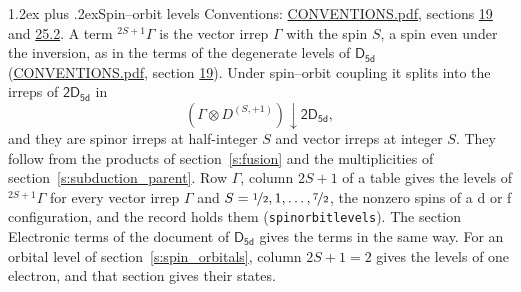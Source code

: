 \documentclass[10pt,a4paper]{article}
\makeatletter
\renewcommand\section{\@startsection{section}{1}{\z@}{-3ex plus -1ex minus -.2ex}%
  {1.2ex plus .2ex}{\normalfont\large\sffamily\bfseries\color{parttitle}}}
\numberwithin{equation}{section}
\newcommand{\grp}[1]{\mathsf{#1}}
\newcommand{\restr}[2]{#1\!\downarrow#2}
\newcommand{\irrJp}[2]{D^{(#1,#2)}}
\newcommand{\irrprod}{\otimes}
\newcommand{\term}[2]{{}^{#1}#2}
\makeatother
\begin{document}
\section{Spin--orbit levels}\label{s:spin_orbit}
Conventions: \href{../../CONVENTIONS.pdf}{CONVENTIONS.pdf}, sections \href{../../../rotation/CONVENTIONS.pdf\#conv.19}{19} and \href{../../CONVENTIONS.pdf\#conv.25.2}{25.2}.
\leavevmode\label{n:local.spin}\label{n:symbol.term}A term $\term{2S+1}{\Gamma}$ is the vector irrep $\Gamma$ with the spin $S$, a spin even under the inversion, as in the terms of the degenerate levels of \href{../../../rotation/data/pdf/D5d.pdf}{$\grp{D_{5d}}$} (\href{../../CONVENTIONS.pdf}{CONVENTIONS.pdf}, section \href{../../../rotation/CONVENTIONS.pdf\#conv.19}{19}). Under spin--orbit coupling it splits into the irreps of $\grp{2D_{5d}}$ in
\begin{equation}\label{e:spinorbit}\restr{(\Gamma \irrprod \irrJp{S}{+1})}{\grp{2D_{5d}}},\end{equation}
and they are spinor irreps at half-integer $S$ and vector irreps at integer $S$. They follow from the products of section~\ref{s:fusion} and the multiplicities of section~\ref{s:subduction_parent}. Row $\Gamma$, column $2S + 1$ of a table gives the levels of $\term{2S+1}{\Gamma}$ for every vector irrep $\Gamma$ and $S = \nicefrac{1}{2}, 1, \dots, \nicefrac{7}{2}$, the nonzero spins of a d or f configuration, and the record holds them (\texttt{spinorbitlevels}). The section Electronic terms of the document of \href{../../../rotation/data/pdf/D5d.pdf}{$\grp{D_{5d}}$} gives the terms in the same way. For an orbital level of section~\ref{s:spin_orbitals}, column $2S + 1 = 2$ gives the levels of one electron, and that section gives their states.
\end{document}
